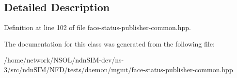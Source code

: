 \subsection{Detailed Description}


Definition at line 102 of file face-\/status-\/publisher-\/common.\+hpp.



The documentation for this class was generated from the following file\+:\begin{DoxyCompactItemize}
\item 
/home/network/\+N\+S\+O\+L/ndn\+S\+I\+M-\/dev/ns-\/3/src/ndn\+S\+I\+M/\+N\+F\+D/tests/daemon/mgmt/face-\/status-\/publisher-\/common.\+hpp\end{DoxyCompactItemize}
